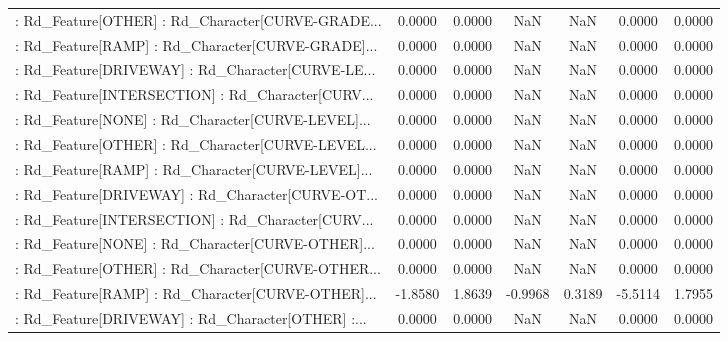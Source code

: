 \begin{longtable}{p{4cm}cccccc}
 : Rd\_Feature[OTHER] : Rd\_Character[CURVE-GRADE... &            0.0000 &            0.0000 &     NaN &          NaN &             0.0000 &            0.0000 \\
 : Rd\_Feature[RAMP] : Rd\_Character[CURVE-GRADE]... &            0.0000 &            0.0000 &     NaN &          NaN &             0.0000 &            0.0000 \\
 : Rd\_Feature[DRIVEWAY] : Rd\_Character[CURVE-LE... &            0.0000 &            0.0000 &     NaN &          NaN &             0.0000 &            0.0000 \\
 : Rd\_Feature[INTERSECTION] : Rd\_Character[CURV... &            0.0000 &            0.0000 &     NaN &          NaN &             0.0000 &            0.0000 \\
 : Rd\_Feature[NONE] : Rd\_Character[CURVE-LEVEL]... &            0.0000 &            0.0000 &     NaN &          NaN &             0.0000 &            0.0000 \\
 : Rd\_Feature[OTHER] : Rd\_Character[CURVE-LEVEL... &            0.0000 &            0.0000 &     NaN &          NaN &             0.0000 &            0.0000 \\
 : Rd\_Feature[RAMP] : Rd\_Character[CURVE-LEVEL]... &            0.0000 &            0.0000 &     NaN &          NaN &             0.0000 &            0.0000 \\
 : Rd\_Feature[DRIVEWAY] : Rd\_Character[CURVE-OT... &            0.0000 &            0.0000 &     NaN &          NaN &             0.0000 &            0.0000 \\
 : Rd\_Feature[INTERSECTION] : Rd\_Character[CURV... &            0.0000 &            0.0000 &     NaN &          NaN &             0.0000 &            0.0000 \\
 : Rd\_Feature[NONE] : Rd\_Character[CURVE-OTHER]... &            0.0000 &            0.0000 &     NaN &          NaN &             0.0000 &            0.0000 \\
 : Rd\_Feature[OTHER] : Rd\_Character[CURVE-OTHER... &            0.0000 &            0.0000 &     NaN &          NaN &             0.0000 &            0.0000 \\
 : Rd\_Feature[RAMP] : Rd\_Character[CURVE-OTHER]... &           -1.8580 &            1.8639 & -0.9968 &       0.3189 &            -5.5114 &            1.7955 \\
 : Rd\_Feature[DRIVEWAY] : Rd\_Character[OTHER] :... &            0.0000 &            0.0000 &     NaN &          NaN &             0.0000 &            0.0000 \\

\end{longtable}
